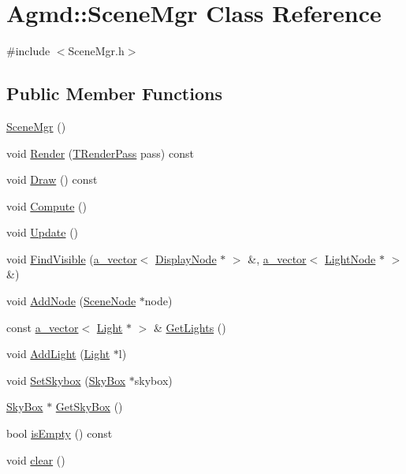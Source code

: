 \hypertarget{class_agmd_1_1_scene_mgr}{\section{Agmd\+:\+:Scene\+Mgr Class Reference}
\label{class_agmd_1_1_scene_mgr}
}


{\ttfamily \#include $<$Scene\+Mgr.\+h$>$}

\subsection*{Public Member Functions}
\begin{DoxyCompactItemize}
\item 
\hyperlink{class_agmd_1_1_scene_mgr_a7a85f552ab1098b9e32cd1cd60b501ad}{Scene\+Mgr} ()
\item 
void \hyperlink{class_agmd_1_1_scene_mgr_ab3a4ce481acca664a7145fdf83c90ee9}{Render} (\hyperlink{namespace_agmd_a893087981df53d0bf39466e9039aeb73}{T\+Render\+Pass} pass) const 
\item 
void \hyperlink{class_agmd_1_1_scene_mgr_abe4d18b8a77e331a9b8679d053eaf244}{Draw} () const 
\item 
void \hyperlink{class_agmd_1_1_scene_mgr_a296ddfa3e7ae29bab9e00f7f4fe97f12}{Compute} ()
\item 
void \hyperlink{class_agmd_1_1_scene_mgr_a7d8f2d1c40ed6e586eac7cf564d0d53f}{Update} ()
\item 
void \hyperlink{class_agmd_1_1_scene_mgr_aaced17f9e6039ff4bf91ae4c831c244f}{Find\+Visible} (\hyperlink{_vector_8h_a3df82cea60ff4ad0acb44e58454406a5}{a\+\_\+vector}$<$ \hyperlink{class_agmd_1_1_display_node}{Display\+Node} $\ast$ $>$ \&, \hyperlink{_vector_8h_a3df82cea60ff4ad0acb44e58454406a5}{a\+\_\+vector}$<$ \hyperlink{class_agmd_1_1_light_node}{Light\+Node} $\ast$ $>$ \&)
\item 
void \hyperlink{class_agmd_1_1_scene_mgr_a8ba20e6b3ae6e7c8f40ec1231b127c5f}{Add\+Node} (\hyperlink{class_agmd_1_1_scene_node}{Scene\+Node} $\ast$node)
\item 
const \hyperlink{_vector_8h_a3df82cea60ff4ad0acb44e58454406a5}{a\+\_\+vector}$<$ \hyperlink{class_agmd_1_1_light}{Light} $\ast$ $>$ \& \hyperlink{class_agmd_1_1_scene_mgr_a81e0060b946f7872902bdfb2b6ceed4d}{Get\+Lights} ()
\item 
void \hyperlink{class_agmd_1_1_scene_mgr_ab5c12674da7cbe09748ec4194cfc1ada}{Add\+Light} (\hyperlink{class_agmd_1_1_light}{Light} $\ast$l)
\item 
void \hyperlink{class_agmd_1_1_scene_mgr_a6c5865c0fd260a8d9f8e4137ba9857c0}{Set\+Skybox} (\hyperlink{class_agmd_1_1_sky_box}{Sky\+Box} $\ast$skybox)
\item 
\hyperlink{class_agmd_1_1_sky_box}{Sky\+Box} $\ast$ \hyperlink{class_agmd_1_1_scene_mgr_a866ea0e5d612e646b72f36424411b6e1}{Get\+Sky\+Box} ()
\item 
bool \hyperlink{class_agmd_1_1_scene_mgr_a85a01fc699819fa7750d94900017b1e3}{is\+Empty} () const 
\item 
void \hyperlink{class_agmd_1_1_scene_mgr_a09d311f47a6117105bff08450013e0f0}{clear} ()
\end{DoxyCompactItemize}


